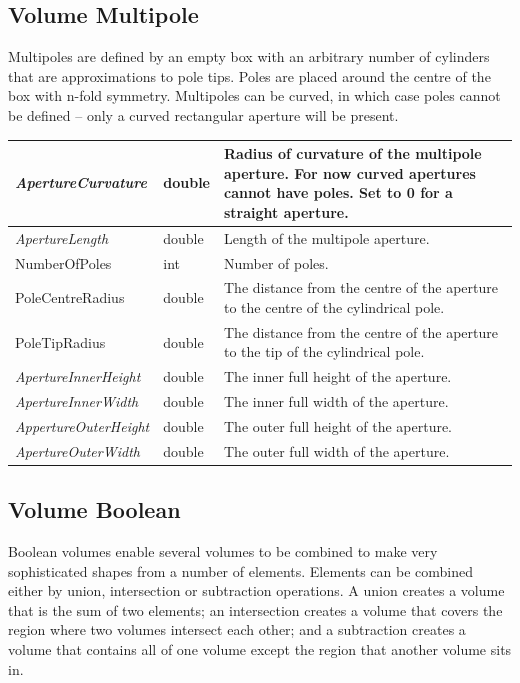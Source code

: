 \subsection{Volume Multipole}
Multipoles are defined by an empty box with an arbitrary number of cylinders that are approximations to pole tips. Poles
are placed around the centre of the box with n-fold symmetry. Multipoles can be curved, in which case poles cannot be
defined -- only a curved rectangular aperture will be present.

\begin{center}
\tabletail{}
\tablelasttail{}
\begin{supertabular}{|m{3.892cm}|m{1.333cm}|m{11.77cm}|}
\hline
{\itshape ApertureCurvature} &
double &
Radius of curvature of the multipole aperture. For now curved apertures cannot have poles. Set to 0 for a straight
aperture.\\\hline
{\itshape ApertureLength} &
double &
Length of the multipole aperture.\\\hline
NumberOfPoles &
int &
Number of poles.\\\hline
PoleCentreRadius &
double &
The distance from the centre of the aperture to the centre of the cylindrical pole.\\\hline
PoleTipRadius &
double &
The distance from the centre of the aperture to the tip of the cylindrical pole.\\\hline
{\itshape ApertureInnerHeight} &
double &
The inner full height of the aperture.\\\hline
{\itshape ApertureInnerWidth} &
double &
The inner full width of the aperture.\\\hline
{\itshape AppertureOuterHeight} &
double &
The outer full height of the aperture.\\\hline
{\itshape ApertureOuterWidth} &
double &
The outer full width of the aperture.\\\hline
\end{supertabular}
\end{center}
\subsection{Volume Boolean}
Boolean volumes enable several volumes to be combined to make very sophisticated shapes from a number of elements.
Elements can be combined either by union, intersection or subtraction operations. A union creates a volume that is the
sum of two elements; an intersection creates a volume that covers the region where two volumes intersect each other;
and a subtraction creates a volume that contains all of one volume except the region that another volume sits in.

